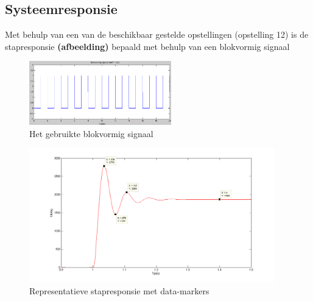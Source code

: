 \documentclass[a4paper]{article}
\begin{document}
\subsection{Systeemresponsie}
Met behulp van een van de beschikbaar gestelde opstellingen (opstelling 12) is de stapresponsie \textbf{(afbeelding)} bepaald met behulp van een blokvormig signaal
\begin{figure}[h]
  \centering
    \includegraphics[width=0.55\textwidth]{Inputsignaal.png}
    \caption{Het gebruikte blokvormig signaal}
\end{figure}

\begin{figure}[h]
  \centering
    \includegraphics[width=0.95\textwidth]{Opstelling_12_stapresponsie.png}
    \caption{Representatieve stapresponsie met data-markers}
\end{figure}
\end{document}
